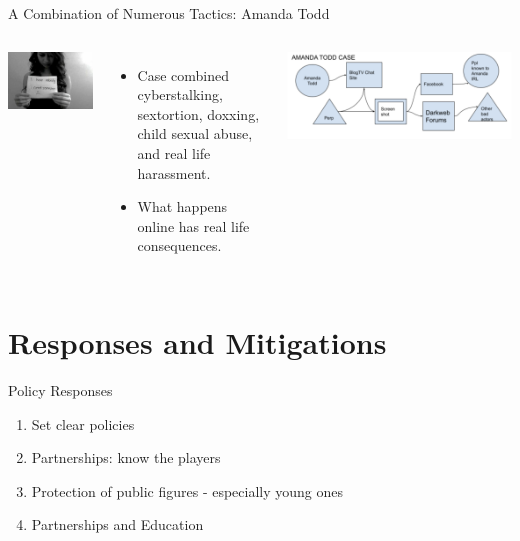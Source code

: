 \documentclass[nobackground,dvipsnames,table,aspectratio=169]{beamer}
\begin{document}
\begin{frame}{A Combination of Numerous Tactics: Amanda Todd}
    \begin{columns}
            \includegraphics[width=\textwidth]{i-have-nobody}
            \begin{itemize}
                \item Case combined cyberstalking, sextortion, doxxing, child sexual abuse, and real life harassment.
                \item What happens online has real life consequences.
            \end{itemize}
            \includegraphics[width=\textwidth]{amanda-todd-case}
    \end{columns}
\end{frame}

\section{Responses and Mitigations}

\begin{frame}{Policy Responses}
    \begin{enumerate}
        \item Set clear policies 
        \item Partnerships: know the players
        \item Protection of public figures - especially young ones
        \item Partnerships and Education
    \end{enumerate}
\end{frame}
\end{document}
